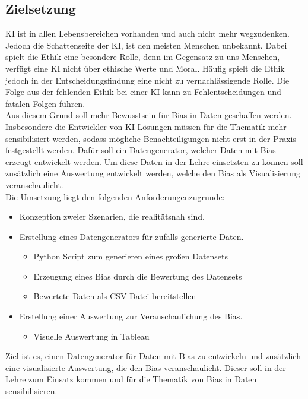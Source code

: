 \begin{onehalfspace}
    \newpage
    \section{Zielsetzung}
    \label{subsec:zielsetzung}
    \ac*{KI} ist in allen Lebensbereichen vorhanden und auch nicht mehr wegzudenken. Jedoch die Schattenseite der \ac*{KI}, ist den meisten Menschen unbekannt. Dabei spielt die Ethik eine besondere Rolle, denn im Gegensatz zu uns Menschen, verfügt eine \ac*{KI} nicht über ethische Werte und Moral. Häufig spielt die Ethik jedoch in der Entscheidungsfindung eine nicht zu vernachlässigende Rolle. Die Folge aus der fehlenden Ethik bei einer \ac*{KI} kann zu Fehlentscheidungen und fatalen Folgen führen.
    \\
    Aus diesem Grund soll mehr Bewusstsein für Bias in Daten geschaffen werden. Insbesondere die Entwickler von \ac*{KI} Lösungen müssen für die Thematik mehr sensibilisiert werden, sodass mögliche Benachteiligungen nicht erst in der Praxis festgestellt werden. Dafür soll ein Datengenerator, welcher Daten mit Bias erzeugt entwickelt werden. Um diese Daten in der Lehre einsetzten zu können soll zusätzlich eine Auswertung entwickelt werden, welche den Bias als Visualisierung veranschaulicht. 
    \\
    Die Umsetzung liegt den folgenden Anforderungenzugrunde:
    \begin{itemize}
        \item Konzeption zweier Szenarien, die realitätsnah sind.
        \item Erstellung eines Datengenerators für zufalls generierte Daten. 
        \begin{itemize}
            \item Python Script zum generieren eines großen Datensets
            \item Erzeugung eines Bias durch die Bewertung des Datensets
            \item Bewertete Daten als CSV Datei bereitstellen
        \end{itemize}
        \item Erstellung einer Auswertung zur Veranschaulichung des Bias.
        \begin{itemize}
            \item Visuelle Auswertung in Tableau
        \end{itemize}
    \end{itemize} 
    Ziel ist es, einen Datengenerator für Daten mit Bias zu entwickeln und zusätzlich eine visualisierte Auswertung, die den Bias veranschaulicht. Dieser soll in der Lehre zum Einsatz kommen und für die Thematik von Bias in Daten sensibilisieren.


\end{onehalfspace}
